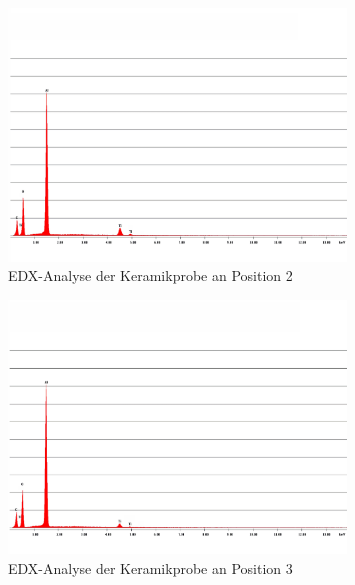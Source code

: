 \documentclass[12pt,english,ngerman]{scrartcl}
\begin{document}
\begin{figure}[H]
	\begin{center}
		\includegraphics[width =0.8\textwidth]{./figures/edx2.png}
	\end{center}
	\caption{EDX-Analyse der Keramikprobe an Position 2~\cite{sein_foto}
	}\label{fig:position2}
\end{figure}
\begin{figure}[H]
	\begin{center}
		\includegraphics[width =0.8\textwidth]{./figures/edx3.png}
	\end{center}
	\caption{EDX-Analyse der Keramikprobe an Position 3~\cite{sein_foto}
	}\label{fig:position3}
\end{figure}
\end{document}
